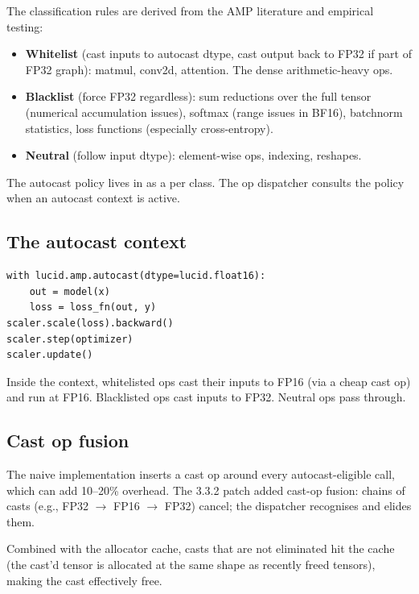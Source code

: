 The classification rules are derived from the AMP literature
and empirical testing:

\begin{itemize}
  \item \textbf{Whitelist} (cast inputs to autocast dtype,
    cast output back to FP32 if part of FP32 graph): matmul,
    conv2d, attention. The dense arithmetic-heavy ops.
  \item \textbf{Blacklist} (force FP32 regardless): sum
    reductions over the full tensor (numerical accumulation
    issues), softmax (range issues in BF16), batchnorm
    statistics, loss functions (especially cross-entropy).
  \item \textbf{Neutral} (follow input dtype): element-wise
    ops, indexing, reshapes.
\end{itemize}

The autocast policy lives in
 as a  per class.
The op dispatcher consults the policy when an autocast context
is active.

\subsection{The autocast context}
\label{ssec:amp_integration:autocast_ctx}

\begin{lstlisting}[style=lucid,language=LucidPython]
with lucid.amp.autocast(dtype=lucid.float16):
    out = model(x)
    loss = loss_fn(out, y)
scaler.scale(loss).backward()
scaler.step(optimizer)
scaler.update()
\end{lstlisting}

Inside the context, whitelisted ops cast their inputs to FP16
(via a cheap cast op) and run at FP16. Blacklisted ops cast
inputs to FP32. Neutral ops pass through.

\subsection{Cast op fusion}
\label{ssec:amp_integration:cast_fusion}

The naive implementation inserts a cast op around every
autocast-eligible call, which can add 10--20\% overhead. The
3.3.2 patch added cast-op fusion: chains of casts (e.g., FP32
$\to$ FP16 $\to$ FP32) cancel; the dispatcher recognises and
elides them.

Combined with the allocator cache, casts that are not eliminated
hit the cache (the cast'd tensor is allocated at the same shape
as recently freed tensors), making the cast effectively free.


